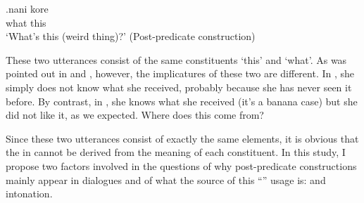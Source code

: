 \exg.\label{nanikore}nani kore \\
	what this \\
	`What's this (weird thing)?'
	\hfill{(Post-predicate construction)}

These two utterances consist of the same constituents  `this' and  `what'.
As was pointed out in  and ,
however, the implicatures of these two are different.
In \LLast,
she simply does not know what she received,
probably because she has never seen it before.
By contrast, in \Last,
she knows what she received (it's a banana case) but she did not like it, as we expected.
Where does this  come from?

Since these two utterances consist of exactly the same elements,
it is obvious that the  in \Last cannot be derived from the meaning of each constituent.
In this study, I propose two factors involved in the questions of why post-predicate constructions mainly appear in dialogues and of what the source of this ``'' usage is:
 and intonation.

